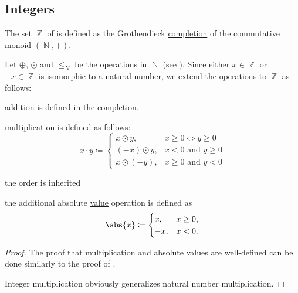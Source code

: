 \subsection{Integers}\label{subsec:integers}

\begin{definition}\label{def:integers}
  The set \( \BbbZ \) of  is defined as the Grothendieck \hyperref[thm:monoid_completion_to_abelian_group]{completion} of the commutative monoid \( (\BbbN, +) \).

  Let \( \oplus \), \( \odot \) and \( \leq_N \) be the operations in \( \BbbN \) (see ). Since either \( x \in \BbbZ \) or \( -x \in \BbbZ \) is isomorphic to a natural number, we extend the operations to \( \BbbZ \) as follows:
  \begin{thmenum}
    \item addition is defined in the completion.
    \item multiplication is defined as follows:
          \begin{equation*}
            x \cdot y \coloneqq \begin{cases}
              x \odot y,    & x \geq 0 \iff y \geq 0      \\
              (-x) \odot y, & x < 0 \text{ and } y \geq 0 \\
              x \odot (-y), & x \geq 0 \text{ and } y < 0
            \end{cases}
          \end{equation*}

     the order is inherited
    \item the additional absolute \hyperref[def:absolute_value]{value} operation is defined as
          \begin{equation*}
            \abs{x} \coloneqq \begin{cases}
              x,  & x \geq 0, \\
              -x, & x < 0.
            \end{cases}
          \end{equation*}
  \end{thmenum}
\end{definition}
\begin{proof}
  The proof that multiplication and absolute values are well-defined can be done similarly to the proof of .

  Integer multiplication obviously generalizes natural number multiplication.
\end{proof}


